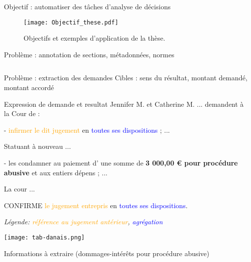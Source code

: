 \begin{frame}[c]{Objectif : automatiser des tâches d'analyse de décisions}
		\begin{figure}[!htb]
		\texttt{[image: Objectif\_these.pdf]}
		\caption{Objectifs et exemples d'application de la thèse.} \label{fig:intro:objectif-these}
	\end{figure}

\end{frame}

\begin{frame}[c]{Problème : annotation de sections, métadonnées, normes}
    \tiny
	\lstset{language=XMl}
	\begin{columns}
		\begin{column}{.50\linewidth}
        
        \end{column}
		\begin{column}{.50\linewidth}
		
	    \end{column}
	\end{columns}
\end{frame}

\begin{frame}[c]{Problème : extraction des demandes}
	Cibles : sens du résultat, montant demandé, montant accordé
\begin{exampleblock}{Expression de demande et resultat}
\scriptsize
Jennifer M. et Catherine M. ... demandent à la Cour de :

- \textcolor{orange}{infirmer le dit jugement} en \textcolor{blue}{toutes ses dispositions} ; 
...

Statuant à nouveau ...

- les condamner au paiement d' une somme de  \textbf{3 000,00 € pour procédure abusive} et
aux entiers dépens ; ...

La cour ...  

CONFIRME \textcolor{orange}{le jugement entrepris} en \textcolor{blue}{toutes ses dispositions}.

\end{exampleblock}

\scriptsize{\textit{Légende:  \textcolor{orange}{référence au jugement antérieur},  \textcolor{blue}{agrégation}}}


\begin{table} 
\centering \texttt{[image: tab-danais.png]}
\caption{\scriptsize Informations à extraire (dommages-intérêts pour procédure abusive)}
\end{table}
\end{frame}

